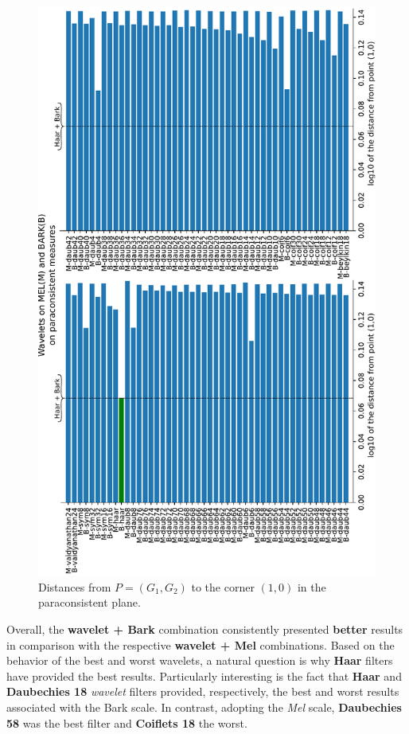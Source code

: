 	\begin{figure}[H]
		\centering
		\includegraphics[angle=-90,scale=.49]{images/results/paraconsistentPlane/ParaconsistentFull.pdf}
		\caption{Distances from $P=(G_1,G_2)$ to the corner $(1,0)$ in the paraconsistent plane.}
		\label{fig:paraconsistentfull}
	\end{figure}
	\par Overall, the \textbf{wavelet + Bark} combination consistently presented \textbf{better} results in comparison with the respective \textbf{wavelet + Mel} combinations. Based on the behavior of the best and worst wavelets, a natural question is why \textbf{Haar} filters have provided the best results. Particularly interesting is the fact that \textbf{Haar} and \textbf{Daubechies 18} \textit{wavelet} filters provided, respectively, the best and worst results associated with the Bark scale. In contrast, adopting the \textit{Mel} scale, \textbf{Daubechies 58} was the best filter and \textbf{Coiflets 18} the worst.
